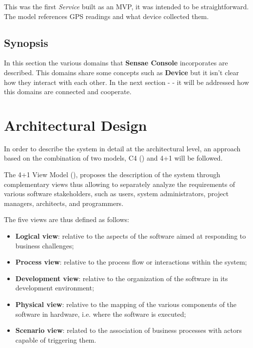 This was the first \textit{Service} built as an \gls{MVP}, it was intended to be straightforward. The model references \gls{GPS} readings and what device collected them.

\subsection{Synopsis}
\label{subsec:design:domain:synopsis}

In this section the various domains that \textbf{Sensae Console} incorporates are described. This domains share some concepts such as \textbf{Device} but it isn't clear how they interact with each other. In the next section -  - it will be addressed how this domains are connected and cooperate.

\section{Architectural Design}
\label{sec:design:architecture}

In order to describe the system in detail at the architectural level, an approach based on the combination of two models, C4 (\cite{c4model-site}) and 4+1  will be followed.

The 4+1 View Model (\cite{4plus1model}), proposes the description of the system through complementary views thus allowing to separately analyze the requirements of various software stakeholders, such as users, system administrators, project managers, architects, and programmers.

The five views are thus defined as follows:
\begin{itemize}
   \item \textbf{Logical view}: relative to the aspects of the software aimed at responding to business challenges;
   \item \textbf{Process view}: relative to the process flow or interactions within the system;
   \item \textbf{Development view}: relative to the organization of the software in its development environment;
   \item \textbf{Physical view}: relative to the mapping of the various components of the software in hardware, i.e. where the software is executed;
   \item \textbf{Scenario view}: related to the association of business processes with actors capable of triggering them.
\end{itemize}

